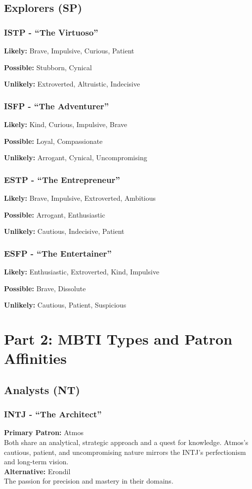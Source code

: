 \documentclass[a4paper,twoside,openany]{book}
\begin{document}
\begin{multicols}{2}
	\subsection*{Explorers (SP)}
	\subsubsection*{ISTP - ``The Virtuoso''}
	\textbf{Likely:} Brave, Impulsive, Curious, Patient

	\textbf{Possible:} Stubborn, Cynical

	\textbf{Unlikely:} Extroverted, Altruistic, Indecisive

	\subsubsection*{ISFP - ``The Adventurer''}
	\textbf{Likely:} Kind, Curious, Impulsive, Brave

	\textbf{Possible:} Loyal, Compassionate

	\textbf{Unlikely:} Arrogant, Cynical, Uncompromising

	\subsubsection*{ESTP - ``The Entrepreneur''}
	\textbf{Likely:} Brave, Impulsive, Extroverted, Ambitious

	\textbf{Possible:} Arrogant, Enthusiastic

	\textbf{Unlikely:} Cautious, Indecisive, Patient

	\subsubsection*{ESFP - ``The Entertainer''}
	\textbf{Likely:} Enthusiastic, Extroverted, Kind, Impulsive

	\textbf{Possible:} Brave, Dissolute

	\textbf{Unlikely:} Cautious, Patient, Suspicious

	\section*{Part 2: MBTI Types and Patron Affinities}

	\subsection*{Analysts (NT)}
	\subsubsection*{INTJ - ``The Architect''}
	\textbf{Primary Patron:} Atmos\\
	Both share an analytical, strategic approach and a quest for knowledge. Atmos's cautious, patient, and uncompromising nature mirrors the INTJ's perfectionism and long-term vision.\\
	\textbf{Alternative:} Erondil\\
	The passion for precision and mastery in their domains.


\end{multicols}
\end{document}
